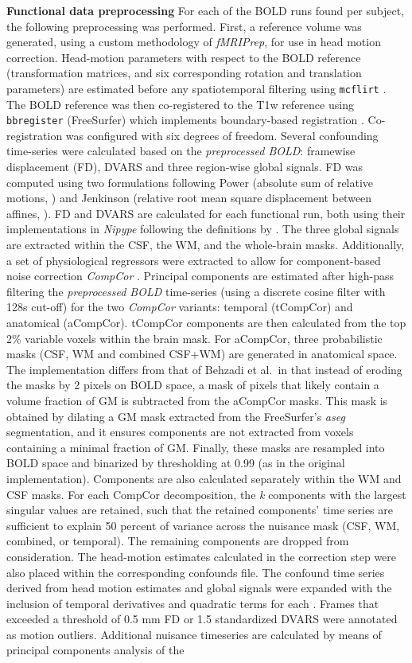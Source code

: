 \textbf{Functional data preprocessing}
For each of the BOLD runs found per subject, the following preprocessing was performed. First, a reference volume was generated, using a custom methodology of \emph{fMRIPrep}, for use in head motion correction. Head-motion parameters with respect to the BOLD reference (transformation matrices, and six corresponding rotation and translation parameters) are estimated before any spatiotemporal filtering using \texttt{mcflirt} \cite{mcflirt}. The BOLD reference was then co-registered to the T1w reference using \texttt{bbregister} (FreeSurfer) which implements boundary-based registration \cite{bbr}. Co-registration was configured with six degrees of freedom. Several confounding time-series were calculated based on the \emph{preprocessed BOLD}: framewise displacement (FD), DVARS and three region-wise global signals. FD was computed using two formulations following Power (absolute sum of relative motions, \cite{power_fd_dvars}) and Jenkinson (relative root mean square displacement between affines, \cite{mcflirt}). FD and DVARS are calculated for each functional run, both using their implementations in \emph{Nipype} following the definitions by \cite{power_fd_dvars}. The three global signals are extracted within the CSF, the WM, and the whole-brain masks. Additionally, a set of physiological regressors were extracted to allow for component-based noise correction \emph{CompCor} \cite{compcor}. Principal components are estimated after high-pass filtering the \emph{preprocessed BOLD} time-series (using a discrete cosine filter with 128s cut-off) for the two \emph{CompCor} variants: temporal (tCompCor) and anatomical (aCompCor). tCompCor components are then calculated from the top 2\% variable voxels within the brain mask. For aCompCor, three probabilistic masks (CSF, WM and combined CSF+WM) are generated in anatomical space. The implementation differs from that of Behzadi et al.~in that instead of eroding the masks by 2 pixels on BOLD space, a mask of pixels that likely contain a volume fraction of GM is subtracted from the aCompCor masks. This mask is obtained by dilating a GM mask extracted from the FreeSurfer's \emph{aseg} segmentation, and it ensures components are not extracted from voxels containing a minimal fraction of GM. Finally, these masks are resampled into BOLD space and binarized by thresholding at 0.99 (as in the original implementation). Components are also calculated separately within the WM and CSF masks. For each CompCor decomposition, the \emph{k} components with the largest singular values are retained, such that the retained components' time series are sufficient to explain 50 percent of variance across the nuisance mask (CSF, WM, combined, or temporal). The remaining components are dropped from consideration. The head-motion estimates calculated in the correction step were also placed within the corresponding confounds file. The confound time series derived from head motion estimates and global signals were expanded with the inclusion of temporal derivatives and quadratic terms for each \cite{confounds_satterthwaite_2013}. Frames that exceeded a threshold of 0.5 mm FD or 1.5 standardized DVARS were annotated as motion outliers. Additional nuisance timeseries are calculated by means of principal components analysis of the 